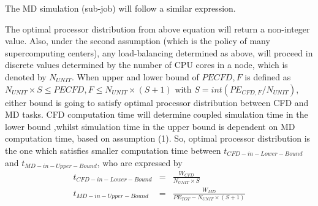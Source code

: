 \documentclass[conference,final]{IEEEtran}
\newcommand{\jhanote}[1]{ {\textcolor{red} { ***Jha: #1 }}}
\newcommand{\jhanote}[1]{}
\begin{document}
The MD simulation (sub-job) will follow a similar expression. 

The optimal processor distribution from above equation will return a
non-integer value. Also, under the second assumption (which is the
policy of many supercomputing centers), any load-balancing determined
as above, will proceed in discrete values determined by the number of CPU cores in a node, which is denoted by $N_{UNIT}$. When upper and lower bound of $PE{CFD,F}$ is defined as 
$
N_{UNIT} \times S \le PE{CFD,F} \le N_{UNIT} \times (S+1)
$
with $S = int(PE_{CFD,F} / N_{UNIT})$, either bound is going to satisfy optimal processor distribution between CFD and MD tasks. CFD computation time will determine coupled simulation time in the lower bound ,whilst simulation time in the upper bound is dependent on MD computation time, based on assumption (1). So, optimal processor distribution is the one which satisfies smaller computation time between $t_{CFD-in-Lower-Bound}$ and $t_{MD-in-Upper-Bound}$, who are expressed by
\begin{eqnarray}
t_{CFD-in-Lower-Bound} & = & \frac {W_{CFD}} {N_{UNIT} \times S}
\nonumber \\
t_{MD-in-Upper-Bound} & = & \frac {W_{MD}} {PE_{TOT}-N_{UNIT} \times (S+1)}
\label{eq:Optimal_Time_Condition}
\end{eqnarray}






\end{document}
